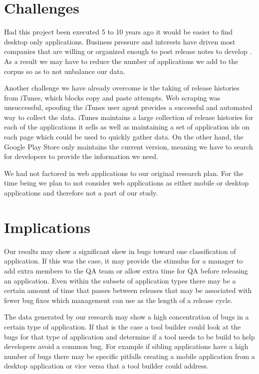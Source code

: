 \documentclass{acm_proc_article-sp}
\begin{document}
\section{Challenges}
Had this project been executed 5 to 10 years ago it would be easier to find desktop only applications. 
Business pressure and interests have driven most companies that are willing or organized enough to post release notes to develop \sibs. 
As a result we may have to reduce the number of applications we add to the corpus so as to not unbalance our data.

Another challenge we have already overcome is the taking of release histories from iTunes, which blocks copy and paste attempts. 
Web scraping was unsuccessful, spoofing the iTunes user agent provides a successful and automated way to collect the data.
iTunes maintains a large collection of release histories for each of the applications it sells as well as maintaining a set of application ids on each page which could be used to quickly gather data.
On the other hand, the Google Play Store only maintains the current version, meaning we have to search for developers to provide the information we need.

We had not factored in web applications to our original research plan. For the time being we plan to not consider web applications as either mobile or desktop applications and therefore not a part of our study.

\section{Implications}
 Our results may show a significant skew in bugs toward one classification of application. If this was the case, it may provide the stimulus for a manager to add extra members to the QA team or allow extra time for QA before releasing an application. 
Even within the subsets of application types there may be a certain amount of time that passes between releases that may be associated with fewer bug fixes which management can use as the length of a release cycle.

 The data generated by our research may show a high concentration of bugs in a certain type of application. 
If that is the case a tool builder could look at the bugs for that type of application and determine if a tool needs to be build to help developers avoid a common bug. 
For example if sibling applications have a high number of bugs there may be specific pitfalls creating a mobile application from a desktop application or vice versa that a tool builder could address.
\end{document}
